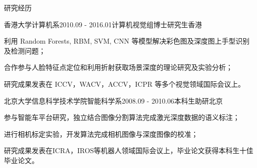 \documentclass[UTF8]{cv_professional-cn} %
\begin{document}
\begin{rSection}{研究经历}

\begin{rSubsection}{香港大学计算机系}{2010.09 - 2016.01}{计算机视觉组博士研究生}{香港}
	\item 利用 Random Forests, RBM, SVM, CNN 等模型解决彩色图及深度图上手型识别及检测问题；
	\item 合作参与人脸特征点定位和利用折射获取场景深度的理论研究及实验分析；
	\item 研究成果发表在 ICCV，WACV，ACCV，ICPR 等多个视觉领域国际会议上。
\end{rSubsection}

\begin{rSubsection}{北京大学信息科学技术学院智能科学系}{2008.09 - 2010.06}{本科生助研}{北京}
    \item 参与智能车平台研究，独立结合图像分割算法完成激光深度数据的语义标注；
    \item 进行相机标定实验，开发算法完成相机图像与深度图像的校准；
    \item 研究成果发表在ICRA，IROS等机器人领域国际会议上，毕业论文获得本科生十佳毕业论文。
\end{rSubsection}

\end{rSection}

\end{document}
